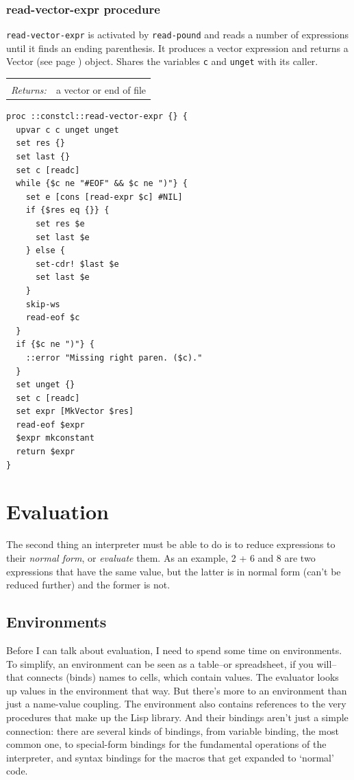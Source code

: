 \documentclass[twoside,9pt]{report}
\begin{document}
\subsection{read-vector-expr procedure}
\label{read-vector-expr-procedure}


\texttt{read-vector-expr} is activated by \texttt{read-pound} and reads a number of expressions until it finds an ending parenthesis. It produces a vector expression and returns a Vector (see page \pageref{vectors}) object. Shares the variables \texttt{c} and \texttt{unget} with its caller.

\noindent\begin{tabular}{ |p{1.9cm} p{8cm}| }
\hline
\rowcolor[HTML]{CCCCCC} \multicolumn{2}{|l|}{\bf read-vector-expr (internal)} \\
\textit{Returns:} & a vector or end of file \\
\hline
\end{tabular}
\begin{lstlisting}
proc ::constcl::read-vector-expr {} {
  upvar c c unget unget
  set res {}
  set last {}
  set c [readc]
  while {$c ne "#EOF" && $c ne ")"} {
    set e [cons [read-expr $c] #NIL]
    if {$res eq {}} {
      set res $e
      set last $e
    } else {
      set-cdr! $last $e
      set last $e
    }
    skip-ws
    read-eof $c
  }
  if {$c ne ")"} {
    ::error "Missing right paren. ($c)."
  }
  set unget {}
  set c [readc]
  set expr [MkVector $res]
  read-eof $expr
  $expr mkconstant
  return $expr
}
\end{lstlisting}
\chapter{Evaluation}
\label{evaluation}


The second thing an interpreter must be able to do is to reduce expressions to their \emph{normal form}, or \emph{evaluate} them. As an example, 2 + 6 and 8 are two expressions that have the same value, but the latter is in normal form (can't be reduced further) and the former is not.

\section{Environments}
\label{environments}


Before I can talk about evaluation, I need to spend some time on environments. To simplify, an environment can be seen as a table--or spreadsheet, if you will--that connects (binds) names to cells, which contain values. The evaluator looks up values in the environment that way. But there's more to an environment than just a name-value coupling. The environment also contains references to the very procedures that make up the Lisp library. And their bindings aren't just a simple connection: there are several kinds of bindings, from variable binding, the most common one, to special-form bindings for the fundamental operations of the interpreter, and syntax bindings for the macros that get expanded to `normal' code.
\end{document}
